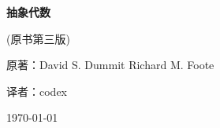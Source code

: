 \documentclass[UTF8, zihao=-4]{ctexbook} %
\theoremstyle{plain} %
\theoremstyle{definition} %
\theoremstyle{remark} %
\begin{document}
\begin{titlepage}
    \centering
    \vspace*{2cm} %
    
    {\Huge\bfseries 抽象代数 \par}
    \vspace{1cm}
    {\LARGE (原书第三版) \par}
    
    \vspace{3cm}
    
    {\Large 原著：David S. Dummit \quad Richard M. Foote \par}
    \vspace{1cm}
    {\Large 译者：codex \par}
    
    \vfill %
    
    {\large \today \par} %
\end{titlepage}

\frontmatter %

\setcounter{page}{1}

\tableofcontents %
\newpage

\mainmatter %
























\end{document}
